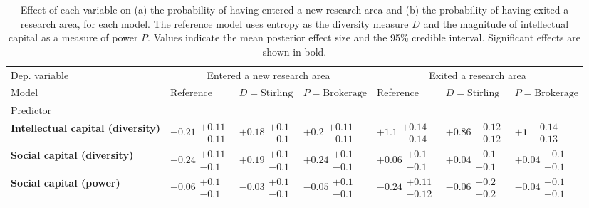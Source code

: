 \begin{table}[H]
\caption{Effect of each variable on (a) the probability of having entered a new research area and (b) the probability of having exited a research area, for each model. The reference model uses entropy as the diversity measure $D$ and the magnitude of intellectual capital as a measure of power $P$. Values indicate the mean posterior effect size and the 95\% credible interval. Significant effects are shown in bold.}
\label{table:summary_entered_exited}
\renewcommand{\arraystretch}{2}\fontsize{6}{7}\selectfont\begin{tabular}{lllllll}
\toprule
Dep. variable & \multicolumn{3}{c}{Entered a new research area} & \multicolumn{3}{c}{Exited a research area} \\
Model & Reference & $D=\text{Stirling}$ & $P=\text{Brokerage}$ & Reference & $D=\text{Stirling}$ & $P=\text{Brokerage}$ \\
Predictor &  &  &  &  &  &  \\
\midrule
\textbf{Intellectual capital (diversity)} & $\bm{+0.21}\substack{+0.11 \\ -0.11}$ & $\bm{+0.18}\substack{+0.1 \\ -0.1}$ & $\bm{+0.2}\substack{+0.11 \\ -0.11}$ & $\bm{+1.1}\substack{+0.14 \\ -0.14}$ & $\bm{+0.86}\substack{+0.12 \\ -0.12}$ & $\bm{+1}\substack{+0.14 \\ -0.13}$ \\
\textbf{Social capital (diversity)} & $\bm{+0.24}\substack{+0.11 \\ -0.1}$ & $\bm{+0.19}\substack{+0.1 \\ -0.1}$ & $\bm{+0.24}\substack{+0.1 \\ -0.1}$ & $+0.06\substack{+0.1 \\ -0.1}$ & $+0.04\substack{+0.1 \\ -0.1}$ & $+0.04\substack{+0.1 \\ -0.1}$ \\
\textbf{Social capital (power)} & $-0.06\substack{+0.1 \\ -0.1}$ & $-0.03\substack{+0.1 \\ -0.1}$ & $-0.05\substack{+0.1 \\ -0.1}$ & $\bm{-0.24}\substack{+0.11 \\ -0.12}$ & $-0.06\substack{+0.2 \\ -0.2}$ & $-0.04\substack{+0.1 \\ -0.1}$ \\

\end{tabular}
\end{table}
